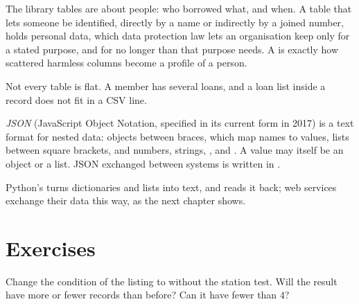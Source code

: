 \begin{inpractice}
The library tables are about people: who borrowed what, and when. A table that lets someone be identified,
directly by a name or indirectly by a joined number, holds personal data, which data protection law lets an
organisation keep only for a stated purpose, and for no longer than that purpose needs. A  is exactly how
scattered harmless columns become a profile of a person.
\end{inpractice}

Not every table is flat. A member has several loans, and a loan list inside a record does not fit in a CSV line.

\begin{definition}[JSON]\label{def:g10:data-tables:json}
\emph{JSON} (JavaScript Object Notation, specified in its current form in 2017) is a text format for
nested data: objects between braces, which map names to values, lists between square brackets, and numbers,
strings, ,  and . A value may itself be an object or a list. JSON exchanged
between systems is written in .
\end{definition}

\label{lst:g10:data-tables:to-json}

\label{out:g10:data-tables:to-json}

Python's  turns dictionaries and lists into  text, and  reads it back; web
services exchange their data this way, as the next chapter shows.

\section{Exercises}\label{sec:g10:data-tables:exercises}

\begin{exercise}[$\star$]\label{exo:g10:data-tables:1}
Change the condition of the  listing to  without the station test. Will the
result have more or fewer records than before? Can it have fewer than $4$?
\end{exercise}


